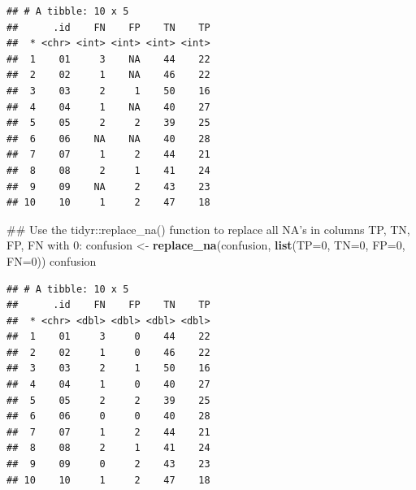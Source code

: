 \documentclass[]{article}
\newenvironment{Shaded}{\begin{snugshade}}{\end{snugshade}}
\newcommand{\KeywordTok}[1]{\textcolor[rgb]{0.13,0.29,0.53}{\textbf{#1}}}
\newcommand{\DataTypeTok}[1]{\textcolor[rgb]{0.13,0.29,0.53}{#1}}
\newcommand{\DecValTok}[1]{\textcolor[rgb]{0.00,0.00,0.81}{#1}}
\newcommand{\StringTok}[1]{\textcolor[rgb]{0.31,0.60,0.02}{#1}}
\newcommand{\OperatorTok}[1]{\textcolor[rgb]{0.81,0.36,0.00}{\textbf{#1}}}
\newcommand{\NormalTok}[1]{#1}
\begin{document}
\begin{verbatim}
## # A tibble: 10 x 5
##      .id    FN    FP    TN    TP
##  * <chr> <int> <int> <int> <int>
##  1    01     3    NA    44    22
##  2    02     1    NA    46    22
##  3    03     2     1    50    16
##  4    04     1    NA    40    27
##  5    05     2     2    39    25
##  6    06    NA    NA    40    28
##  7    07     1     2    44    21
##  8    08     2     1    41    24
##  9    09    NA     2    43    23
## 10    10     1     2    47    18
\end{verbatim}

\begin{Shaded}
\begin{Highlighting}[]
\NormalTok{## Use the tidyr::replace_na() function to replace all NA's in columns TP, TN, FP, FN with 0:}
\NormalTok{confusion <-}\StringTok{ }\KeywordTok{replace_na}\NormalTok{(confusion, }\KeywordTok{list}\NormalTok{(}\DataTypeTok{TP=}\DecValTok{0}\NormalTok{, }\DataTypeTok{TN=}\DecValTok{0}\NormalTok{, }\DataTypeTok{FP=}\DecValTok{0}\NormalTok{, }\DataTypeTok{FN=}\DecValTok{0}\NormalTok{))}
\NormalTok{confusion}
\end{Highlighting}
\end{Shaded}

\begin{verbatim}
## # A tibble: 10 x 5
##      .id    FN    FP    TN    TP
##  * <chr> <dbl> <dbl> <dbl> <dbl>
##  1    01     3     0    44    22
##  2    02     1     0    46    22
##  3    03     2     1    50    16
##  4    04     1     0    40    27
##  5    05     2     2    39    25
##  6    06     0     0    40    28
##  7    07     1     2    44    21
##  8    08     2     1    41    24
##  9    09     0     2    43    23
## 10    10     1     2    47    18
\end{verbatim}

\begin{Shaded}
\end{Shaded}
\end{document}
